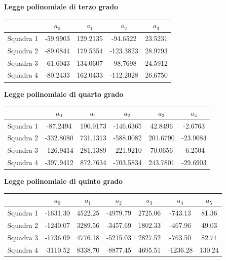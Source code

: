 \textbf{Legge polinomiale di terzo grado}
\begin{table}[H]
    \centering
    \begin{tabular}{|c|c|c|c|c|}
    \hline
              & $a_0$    & $a_1$    & $a_2$     & $a_3$   \\ \hline
    Squadra 1 & -59.9903 & 129.2135 & -94.6522  & 23.5231 \\ \hline
    Squadra 2 & -89.0844 & 179.5354 & -123.3823 & 28.9793 \\ \hline
    Squadra 3 & -61.6043 & 134.0607 & -98.7698  & 24.5912 \\ \hline
    Squadra 4 & -80.2433 & 162.0433 & -112.2028 & 26.6750 \\ \hline
    \end{tabular}
\end{table}

\textbf{Legge polinomiale di quarto grado}
\begin{table}[H]
    \centering
    \begin{tabular}{|c|c|c|c|c|c|}
    \hline
              & $a_0$     & $a_1$    & $a_2$     & $a_3$    & $a_4$    \\ \hline
    Squadra 1 & -87.2494  & 190.9173 & -146.6365 & 42.8496  & -2.6763  \\ \hline
    Squadra 2 & -332.8080 & 731.1313 & -588.0082 & 201.6790 & -23.9084 \\ \hline
    Squadra 3 & -126.9414 & 281.1389 & -221.9210 & 70.0656  & -6.2504  \\ \hline
    Squadra 4 & -397.9412 & 872.7634 & -703.5834 & 243.7801 & -29.6903 \\ \hline
    \end{tabular}
\end{table}

\textbf{Legge polinomiale di quinto grado}
\begin{table}[H]
    \centering
    \begin{tabular}{|c|c|c|c|c|c|c|}
    \hline
              & $a_0$    & $a_1$   & $a_2$    & $a_3$   & $a_4$    & $a_5$  \\ \hline
    Squadra 1 & -1631.30 & 4522.25 & -4979.79 & 2725.06 & -743.13  & 81.36  \\ \hline
    Squadra 2 & -1240.07 & 3289.56 & -3457.69 & 1802.33 & -467.96  & 49.03  \\ \hline
    Squadra 3 & -1736.09 & 4776.18 & -5215.03 & 2827.52 & -763.50  & 82.74  \\ \hline
    Squadra 4 & -3110.52 & 8338.70 & -8877.45 & 4695.51 & -1236.28 & 130.24 \\ \hline
    \end{tabular}
\end{table}

